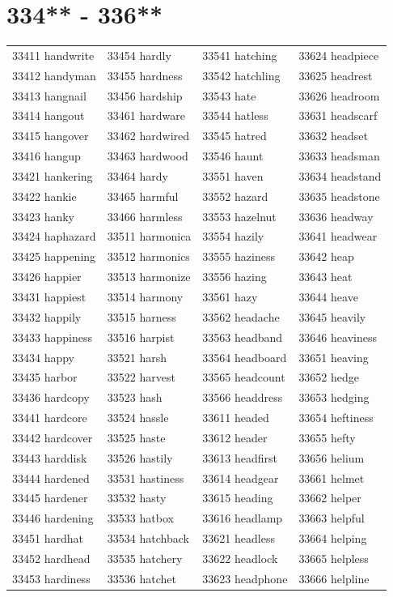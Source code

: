 \documentclass[10pt, oneside]{book}
\begin{document}
\begin{table}
	\centering
	\section*{334** - 336**}
	\begin{tabular}{l l l l}
33411 handwrite &33454 hardly &33541 hatching &33624 headpiece\\
33412 handyman &33455 hardness &33542 hatchling &33625 headrest\\
33413 hangnail &33456 hardship &33543 hate &33626 headroom\\
33414 hangout &33461 hardware &33544 hatless &33631 headscarf\\
33415 hangover &33462 hardwired &33545 hatred &33632 headset\\
33416 hangup &33463 hardwood &33546 haunt &33633 headsman\\
33421 hankering &33464 hardy &33551 haven &33634 headstand\\
33422 hankie &33465 harmful &33552 hazard &33635 headstone\\
33423 hanky &33466 harmless &33553 hazelnut &33636 headway\\
33424 haphazard &33511 harmonica &33554 hazily &33641 headwear\\
33425 happening &33512 harmonics &33555 haziness &33642 heap\\
33426 happier &33513 harmonize &33556 hazing &33643 heat\\
33431 happiest &33514 harmony &33561 hazy &33644 heave\\
33432 happily &33515 harness &33562 headache &33645 heavily\\
33433 happiness &33516 harpist &33563 headband &33646 heaviness\\
33434 happy &33521 harsh &33564 headboard &33651 heaving\\
33435 harbor &33522 harvest &33565 headcount &33652 hedge\\
33436 hardcopy &33523 hash &33566 headdress &33653 hedging\\
33441 hardcore &33524 hassle &33611 headed &33654 heftiness\\
33442 hardcover &33525 haste &33612 header &33655 hefty\\
33443 harddisk &33526 hastily &33613 headfirst &33656 helium\\
33444 hardened &33531 hastiness &33614 headgear &33661 helmet\\
33445 hardener &33532 hasty &33615 heading &33662 helper\\
33446 hardening &33533 hatbox &33616 headlamp &33663 helpful\\
33451 hardhat &33534 hatchback &33621 headless &33664 helping\\
33452 hardhead &33535 hatchery &33622 headlock &33665 helpless\\
33453 hardiness &33536 hatchet &33623 headphone &33666 helpline\\
	\end{tabular}
 \end{table}
\clearpage
\end{document}
